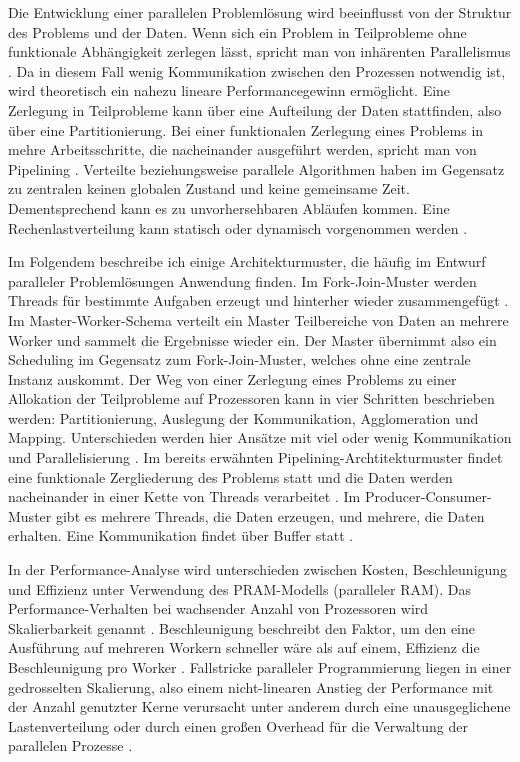 \documentclass[a4paper,12pt,twoside]{article}
\begin{document}
Die Entwicklung einer parallelen Problemlösung wird beeinflusst von der Struktur des Problems und der Daten. Wenn sich ein Problem in Teilprobleme ohne funktionale Abhängigkeit zerlegen lässt, spricht man von inhärenten Parallelismus {\autocite[S. 321f]{Bengel2008}}. Da in diesem Fall wenig Kommunikation zwischen den Prozessen notwendig ist, wird theoretisch ein nahezu lineare Performancegewinn ermöglicht. Eine Zerlegung in Teilprobleme kann über eine Aufteilung der Daten stattfinden, also über eine Partitionierung. Bei einer funktionalen Zerlegung eines Problems in mehre Arbeitsschritte, die nacheinander ausgeführt werden, spricht man von Pipelining {\autocite[S. 324]{Bengel2008}}. Verteilte beziehungsweise parallele Algorithmen haben im Gegensatz zu zentralen keinen globalen Zustand und keine gemeinsame Zeit. Dementsprechend kann es zu unvorhersehbaren Abläufen kommen. Eine Rechenlastverteilung kann statisch oder dynamisch vorgenommen werden {\autocite{Bengel2008}}.

Im Folgendem beschreibe ich einige Architekturmuster, die häufig im Entwurf paralleler Problemlösungen Anwendung finden. Im Fork-Join-Muster werden Threads für bestimmte Aufgaben erzeugt und hinterher wieder zusammengefügt {\autocite[S. 109]{Rauber2013}}. Im Master-Worker-Schema verteilt ein Master Teilbereiche von Daten an mehrere Worker und sammelt die Ergebnisse wieder ein. Der Master übernimmt also ein Scheduling im Gegensatz zum Fork-Join-Muster, welches ohne eine zentrale Instanz auskommt. Der Weg von einer Zerlegung eines Problems zu einer Allokation der Teilprobleme auf Prozessoren kann in vier Schritten beschrieben werden: Partitionierung, Auslegung der Kommunikation, Agglomeration und Mapping. Unterschieden werden hier Ansätze mit viel oder wenig Kommunikation und Parallelisierung {\autocite[S. 326f]{Bengel2008}}. Im bereits erwähnten Pipelining-Archtitekturmuster findet eine funktionale Zergliederung des Problems statt und die Daten werden nacheinander in einer Kette von Threads verarbeitet {\autocite[S. 111]{Rauber2013}}. Im Producer-Consumer-Muster gibt es mehrere Threads, die Daten erzeugen, und mehrere, die Daten erhalten. Eine Kommunikation findet über Buffer statt  {\autocite[S. 112]{Rauber2013}}.

In der Performance-Analyse wird unterschieden zwischen Kosten, Beschleunigung und Effizienz unter Verwendung des PRAM-Modells (paralleler RAM). Das Performance-Verhalten bei wachsender Anzahl von Prozessoren wird Skalierbarkeit genannt {\cite{Rauber2013}}. Beschleunigung beschreibt den Faktor, um den eine Ausführung auf mehreren Workern schneller wäre als auf einem, Effizienz die Beschleunigung pro Worker {\autocite[S. 56]{McCool2012}}. Fallstricke paralleler Programmierung liegen in einer gedrosselten Skalierung, also einem nicht-linearen Anstieg der Performance mit der Anzahl genutzter Kerne verursacht unter anderem durch eine unausgeglichene Lastenverteilung oder durch einen großen Overhead für die Verwaltung der parallelen Prozesse {\autocite[S. 74]{McCool2012}}.
\end{document}
